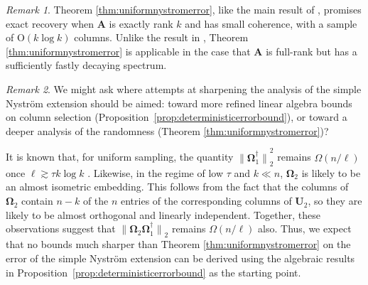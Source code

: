 \documentclass[11pt,letterpaper,twoside,reqno,nosumlimits]{amsart}
\newcommand{\mat}[1]{\ensuremath{\bm{#1}}}
\newcommand{\norm}[1]{\ensuremath{\big\|#1\big\|}}
\theoremstyle{remark}
\newtheorem{remark}{Remark}
\begin{document}
\begin{remark}
 Theorem \ref{thm:uniformnystromerror}, like the main result of \cite{TR10}, promises exact recovery when $\mat{A}$ is exactly rank $k$ and has small coherence, with a sample of $\mathrm{O}(k \log k)$ columns. Unlike the result in \cite{TR10}, Theorem \ref{thm:uniformnystromerror} is applicable in the case that $\mat{A}$ is full-rank but has a sufficiently fastly decaying spectrum.
\end{remark}



\begin{remark}
We might ask where attempts at sharpening the analysis of the simple Nystr\"om extension should be aimed: toward more refined linear algebra bounds on column selection (Proposition~\ref{prop:deterministicerrorbound}), or toward a deeper analysis of the randomness (Theorem \ref{thm:uniformnystromerror})?

 It is known that, for uniform sampling, the quantity $\norm{\mat{\Omega}_1^\dagger}_2^2$ remains $\Omega(n/\ell)$ once $\ell \gtrsim \tau k \log k$ \cite{R99}. Likewise, in the regime of low $\tau$ and $k \ll n$, $\mat{\Omega}_2$ is likely to be an almost isometric embedding. This follows from the fact that the columns of $\mat{\Omega}_2$ contain $n-k$ of the $n$ entries of the corresponding columns of $\mat{U}_2$, so they are likely to be almost orthogonal and linearly independent.  Together, these observations suggest that $\norm{\mat{\Omega}_2 \mat{\Omega}_1^\dagger}_2$ remains $\Omega(n/\ell)$ also. Thus, we expect that no bounds much sharper than Theorem \ref{thm:uniformnystromerror} on the error of the simple Nystr\"om extension can be derived using the algebraic results in Proposition~\ref{prop:deterministicerrorbound} as the starting point. 
\end{remark}
\end{document}
